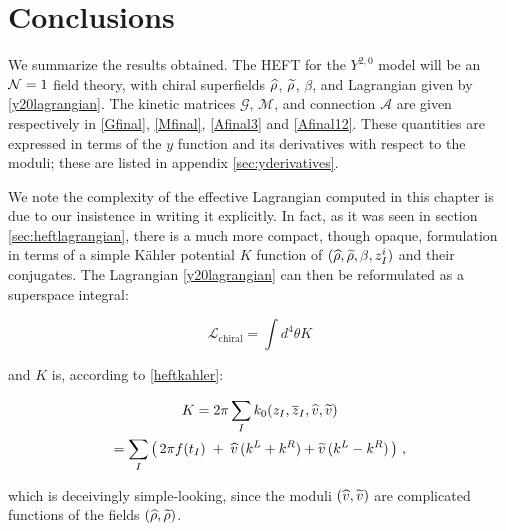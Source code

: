 \section{Conclusions}

We summarize the results obtained. The HEFT for the $Y^{2,0}$ model will be an $\mathcal{N} = 1$ field theory, with chiral superfields $\widehat{\rho}$, $\widetilde{\rho}$, $\beta$, and Lagrangian given by \eqref{y20lagrangian}. The kinetic matrices $\mathcal{G}$, $\mathcal{M}$, and connection $\mathcal{A}$ are given respectively in \eqref{Gfinal}, \eqref{Mfinal}, \eqref{Afinal3} and \eqref{Afinal12}. These quantities are expressed in terms of the $y$ function and its derivatives with respect to the moduli; these are listed in appendix \ref{sec:yderivatives}.

We note the complexity of the effective Lagrangian computed in this chapter is due to our insistence in writing it explicitly. In fact, as it was seen in section \ref{sec:heftlagrangian}, there is a much more compact, though opaque, formulation in terms of a simple K\"ahler potential $K$ function of $(\widehat{\rho},\widetilde{\rho},\beta,z_I^i)$ and their conjugates. The Lagrangian \eqref{y20lagrangian} can then be reformulated as a superspace integral:

\begin{equation}
	\mathcal{L}_\mathrm{chiral} = \int d^4 \theta K
	\label{}
\end{equation}

and $K$ is, according to \eqref{heftkahler}:

\begin{gather}
	K = 2\pi \sum_I k_0(z_I, \overline{z}_I,\widehat{v}, \widetilde{v}) \\
	= \sum_I \left(\, 2\pi f(t_I) \;+\; \widehat{v}\, (k^L + k^R) + \widetilde{v}\,(k^L - k^R)\, \right)\,,
	\label{}
\end{gather}

which is deceivingly simple-looking, since the moduli $(\widehat{v},\widetilde{v})$ are complicated functions of the fields $(\widehat{\rho},\widetilde{\rho})$.




